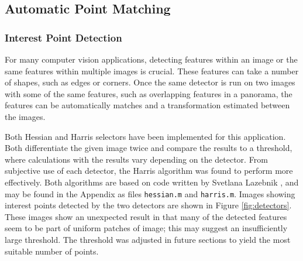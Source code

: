 \documentclass[a4paper, 10pt, conference]{ieeeconf}
\begin{document}
\subsection{Automatic Point Matching }
\subsubsection{Interest Point Detection}
For many computer vision applications, detecting features within an image or the same features within multiple images is crucial. These features can take a number of shapes, such as edges or corners. Once the same detector is run on two images with some of the same features, such as overlapping features in a panorama, the features can be automatically matches and a transformation estimated between the images.

Both Hessian and Harris selectors have been implemented for this application. Both differentiate the given image twice and compare the results to a threshold, where calculations with the results vary depending on the detector. From subjective use of each detector, the Harris algorithm was found to perform more effectively. Both algorithms are based on code written by Svetlana Lazebnik \cite{harrisdetector}, and may be found in the Appendix as files \texttt{hessian.m} and \texttt{harris.m}. Images showing interest points detected by the two detectors are shown in Figure \ref{fig:detectors}. These images show an unexpected result in that many of the detected features seem to be part of uniform patches of image; this may suggest an insufficiently large threshold. The threshold was adjusted in future sections to yield the most suitable number of points.
\end{document}
